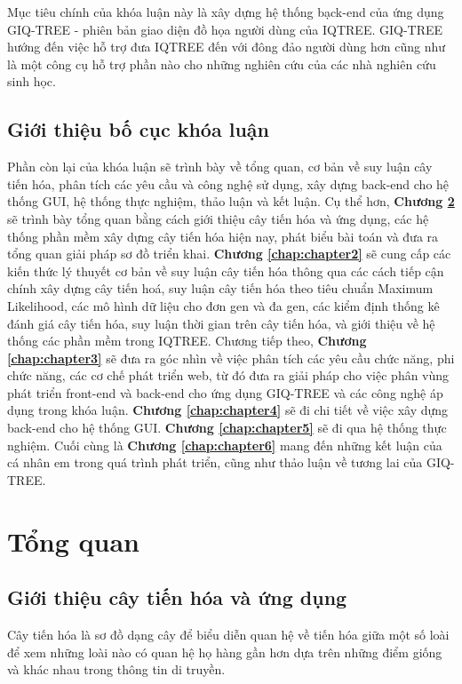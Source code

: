 \documentclass[12pt]{report}
\begin{document}
Mục tiêu chính của khóa luận này là xây dựng hệ thống bạck-end của ứng dụng GIQ-TREE - phiên bản giao diện đồ họa người dùng của IQTREE. GIQ-TREE hướng đến việc hỗ trợ đưa IQTREE đến với đông đảo người dùng hơn cũng như là một công cụ hỗ trợ phần nào cho những nghiên cứu của các nhà nghiên cứu sinh học.
\section{Giới thiệu bố cục khóa luận}
Phần còn lại của khóa luận sẽ trình bày về tổng quan, cơ bản về suy luận cây tiến hóa, phân tích các yêu cầu và công nghệ sử dụng, xây dựng back-end cho hệ thống GUI, hệ thống thực nghiệm, thảo luận và kết luận. Cụ thể hơn, \textbf{Chương \ref{chap:chapter1}} sẽ trình bày tổng quan bằng cách giới thiệu cây tiến hóa và ứng dụng, các hệ thống phần mềm xây dựng cây tiến hóa hiện nay, phát biểu bài toán và đưa ra tổng quan giải pháp sơ đồ triển khai. \textbf{Chương \ref{chap:chapter2}} sẽ cung cấp các kiến thức lý thuyết cơ bản về suy luận cây tiến hóa thông qua các cách tiếp cận chính xây dựng cây tiến hoá, suy luận cây tiến hóa theo tiêu chuẩn Maximum Likelihood, các mô hình dữ liệu cho đơn gen và đa gen, các kiểm định thống kê đánh giá cây tiến hóa, suy luận thời gian trên cây tiến hóa, và giới thiệu về hệ thống các phần mềm trong IQTREE.
Chương tiếp theo, \textbf{Chương \ref{chap:chapter3}} sẽ đưa ra góc nhìn về việc phân tích các yêu cầu chức năng, phi chức năng, các cơ chế phát triển web, từ đó đưa ra giải pháp cho việc phân vùng phát triển front-end và back-end cho ứng dụng GIQ-TREE và các công nghệ áp dụng trong khóa luận.	\textbf{Chương \ref{chap:chapter4}} sẽ đi chi tiết về việc xây dựng back-end cho hệ thống GUI. \textbf{Chương \ref{chap:chapter5}} sẽ đi qua hệ thống thực nghiệm. Cuối cùng là \textbf{Chương \ref{chap:chapter6}} mang đến những kết luận của cá nhân em trong quá trình phát triển, cũng như thảo luận về tương lai của GIQ-TREE.
\newpage	
\chapter{Tổng quan}
\label{chap:chapter1}
\section{Giới thiệu cây tiến hóa và ứng dụng}
Cây tiến hóa là sơ đồ dạng cây để biểu diễn quan hệ về tiến hóa giữa một số loài để xem những loài nào có quan hệ họ hàng gần hơn \cite{cia-0} \cite{cia-1}  dựa trên những điểm giống và khác nhau trong thông tin di truyền.
\end{document}

